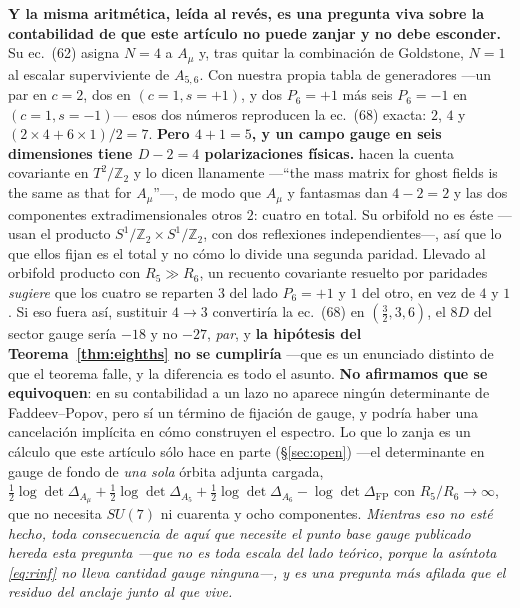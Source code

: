 \documentclass[11pt,a4paper]{article}
\newcommand{\ZZ}{\mathbb{Z}}
\newcommand{\su}[1]{SU(#1)}
\begin{document}
\noindent \textbf{Y la misma aritmética, leída al revés, es una pregunta viva sobre la
contabilidad de \cite{KM25} que este artículo no puede zanjar y no debe esconder.} Su ec.~(62)
asigna $N=4$ a $A_\mu$ y, tras quitar la combinación de Goldstone, $N=1$ al escalar superviviente
de $A_{5,6}$. Con nuestra propia tabla de generadores ---un par en $c=2$, dos en
$(c{=}1,s{=}{+}1)$, y dos $P_6{=}{+}1$ más seis $P_6{=}{-}1$ en $(c{=}1,s{=}{-}1)$--- esos dos
números reproducen la ec.~(68) exacta: $2$, $4$ y $(2\times4+6\times1)/2=7$. \textbf{Pero $4+1=5$,
y un campo gauge en seis dimensiones tiene $D-2=4$ polarizaciones físicas.} \cite{HNT} hacen la
cuenta covariante en $T^2/\ZZ_2$ y lo dicen llanamente ---``the mass matrix for ghost fields is the
same as that for $A_\mu$''---, de modo que $A_\mu$ y fantasmas dan $4-2=2$ y las dos componentes
extradimensionales otros $2$: cuatro en total. Su orbifold no es éste ---\cite{KM25} usan el
producto $S^1/\ZZ_2\times S^1/\ZZ_2$, con dos reflexiones independientes---, así que lo que ellos
fijan es el total y no cómo lo divide una segunda paridad. Llevado al orbifold producto con
$R_5\gg R_6$, un recuento covariante resuelto por paridades \emph{sugiere} que los cuatro se
reparten $3$ del lado $P_6{=}{+}1$ y $1$ del otro, en vez de $4$ y $1$. Si eso fuera así,
sustituir $4\to3$ convertiría la ec.~(68) en $(\tfrac32,3,6)$, el $8D$ del sector gauge sería
$-18$ y no $-27$, \emph{par}, y \textbf{la hipótesis del Teorema~\ref{thm:eighths} no se
cumpliría} ---que es un enunciado distinto de que el teorema falle, y la diferencia es todo el
asunto. \textbf{No afirmamos que \cite{KM25} se
equivoquen}: en su contabilidad a un lazo no aparece ningún determinante de Faddeev--Popov, pero sí
un término de fijación de gauge, y podría haber una cancelación implícita en cómo construyen el
espectro. Lo que lo zanja es un cálculo que este artículo sólo hace en parte (\S\ref{sec:open}) ---el determinante en gauge de
fondo de \emph{una sola} órbita adjunta cargada, $\tfrac12\log\det\Delta_{A_\mu}
+\tfrac12\log\det\Delta_{A_5}+\tfrac12\log\det\Delta_{A_6}-\log\det\Delta_{\mathrm{FP}}$ con
$R_5/R_6\to\infty$, que no necesita $\su7$ ni cuarenta y ocho componentes. \emph{Mientras eso no
esté hecho, toda consecuencia de aquí que necesite el punto base gauge publicado hereda esta
pregunta ---que no es toda escala del lado teórico, porque la asíntota \eqref{eq:rinf} no lleva
cantidad gauge ninguna---, y es una pregunta más afilada que el
residuo del anclaje junto al que vive.}
\end{document}
